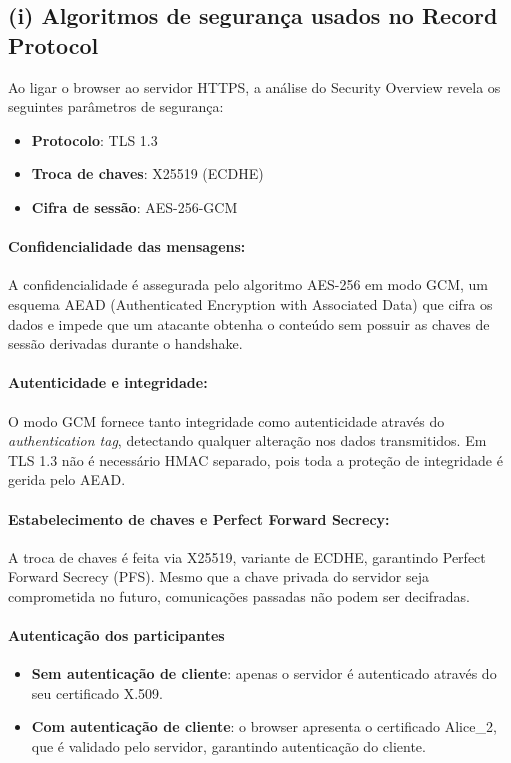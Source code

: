 \subsection{(i) Algoritmos de segurança usados no Record Protocol}

Ao ligar o browser ao servidor HTTPS, a análise do Security Overview revela os seguintes parâmetros de segurança:

\begin{itemize}
    \item \textbf{Protocolo}: TLS 1.3
    \item \textbf{Troca de chaves}: X25519 (ECDHE)
    \item \textbf{Cifra de sessão}: AES-256-GCM
\end{itemize}

\paragraph{Confidencialidade das mensagens:}
A confidencialidade é assegurada pelo algoritmo AES-256 em modo GCM, um esquema AEAD (Authenticated Encryption with Associated Data) que cifra os dados e impede que um atacante obtenha o conteúdo sem possuir as chaves de sessão derivadas durante o handshake.

\paragraph{Autenticidade e integridade:}
O modo GCM fornece tanto integridade como autenticidade através do \textit{authentication tag}, detectando qualquer alteração nos dados transmitidos. Em TLS 1.3 não é necessário HMAC separado, pois toda a proteção de integridade é gerida pelo AEAD.

\paragraph{Estabelecimento de chaves e Perfect Forward Secrecy:}
A troca de chaves é feita via X25519, variante de ECDHE, garantindo Perfect Forward Secrecy (PFS). Mesmo que a chave privada do servidor seja comprometida no futuro, comunicações passadas não podem ser decifradas.

\paragraph{Autenticação dos participantes}
\begin{itemize}
    \item \textbf{Sem autenticação de cliente}: apenas o servidor é autenticado através do seu certificado X.509.
    \item \textbf{Com autenticação de cliente}: o browser apresenta o certificado Alice\_2, que é validado pelo servidor, garantindo autenticação do cliente.
\end{itemize}

